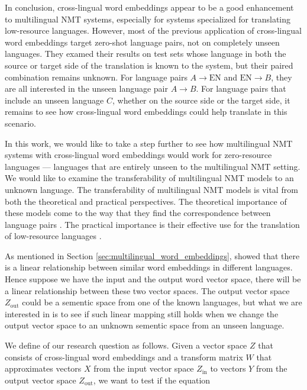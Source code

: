 \documentclass[thesis,fonts=libertine]{cluu}
\begin{document}
In conclusion, cross-lingual word embeddings appear to be a good enhancement to multilingual NMT systems, especially for systems specialized for translating low-resource languages. However, most of the previous application of cross-lingual word embeddings target zero-shot language pairs, not on completely unseen languages. They examed their results on test sets whose language in both the source or target side of the translation is known to the system, but their paired combination remains unknown. For language pairs $A \rightarrow \text{EN}$ and $\text{EN} \rightarrow B$, they are all interested in the unseen language pair $A \rightarrow B$. For language pairs that include an unseen language $C$, whether on the source side or the target side, it remains to see how cross-lingual word embeddings could help translate in this scenario.

In this work, we would like to take a step further to see how multilingual NMT systems with cross-lingual word embeddings would work for zero-resource languages --- languages that are entirely unseen to the multilingual NMT setting. We would like to examine the transferability of multilingual NMT models to an unknown language. The transferability of multilingual NMT models is vital from both the theoretical and practical perspectives. The theoretical importance of these models come to the way that they find the correspondence between language pairs \parencite{Johnson:2016aa,lu-etal-2018-neural}. The practical importance is their effective use for the translation of low-resource languages \parencite{Zoph:2016aa,Nguyen:2017aa}.

As mentioned in Section \ref{sec:multilingual_word_embeddings}, \textcite{Mikolov:2013ac} showed that there is a linear relationship between similar word embeddings in different languages. Hence suppose we have the input and the output word vector space, there will be a linear relationship between these two vector spaces. The output vector space $Z_\text{out}$ could be a sementic space from one of the known languages, but what we are interested in is to see if such linear mapping still holds when we change the output vector space to an unknown sementic space from an unseen language.

We define of our research question as follows. Given a vector space $Z$ that consists of cross-lingual word embeddings and a transform matrix $W$ that approximates vectors $X$ from the input vector space $Z_\text{in}$ to vectors $Y$ from the output vector space $Z_\text{out}$, we want to test if the equation
\end{document}
